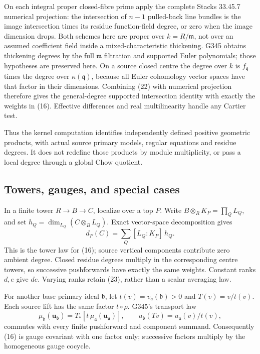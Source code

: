 On each integral proper closed-fibre prime apply the complete
Stacks 33.45.7 numerical projection:
the intersection of \(n-1\) pulled-back line bundles is the
image intersection times its residue function-field degree,
or zero when the image dimension drops. Both schemes here
are proper over \(k=R/\mathfrak m\), not over an assumed
coefficient field inside a mixed-characteristic thickening.
G345 obtains thickening degrees by the full \(\mathfrak m\)
filtration and supported Euler polynomials; those hypotheses
are preserved here. On a source closed centre the degree over
\(k\) is \(f_{\mathfrak q}\) times the degree over
\(\kappa(\mathfrak q)\), because all Euler cohomology vector
spaces have that factor in their dimensions.
Combining (22) with numerical projection therefore gives
the general-degree supported intersection identity with
exactly the weights in (16).
Effective differences and real multilinearity handle any
Cartier test.

Thus the kernel computation identifies independently defined
positive geometric products, with actual source primary
models, regular equations and residue degrees. It does not
redefine those products by module multiplicity, or pass a
local degree through a global Chow quotient.

\subsection*{Towers, gauges, and special cases}
In a finite tower \(R\to B\to C\), localize over a top \(P\).
Write \(B\otimes_R K_P=\prod_Q L_Q\), and set
\(h_Q=\dim_{L_Q}(C\otimes_B L_Q)\). Exact vector-space
decomposition gives
\[
 d_P(C)=\sum_Q [L_Q:K_P]\,h_Q.                                \tag{23}
\]
This is the tower law for (16); source vertical components
contribute zero ambient degree. Closed residue degrees multiply
in the corresponding centre towers, so successive pushforwards
have exactly the same weights. Constant ranks \(d,e\) give \(de\).
Varying ranks retain (23), rather than a scalar averaging law.

For another base primary ideal \(\mathfrak b\), let
\(t(v)=v_{\mathfrak a}(\mathfrak b)>0\) and
\(T(v)=v/t(v)\). Each source lift has the same factor
\(t\circ\rho\). G345's transport law
\[
 \mu_{\mathfrak b}(\boldsymbol u_{\mathfrak b})
    =T_*[t\,\mu_{\mathfrak a}(\boldsymbol u_{\mathfrak a})],
 \qquad u_{\mathfrak b}(Tv)=u_{\mathfrak a}(v)/t(v),             \tag{24}
\]
commutes with every finite pushforward and component summand.
Consequently (16) is gauge covariant with one factor only;
successive factors multiply by the homogeneous gauge cocycle.

